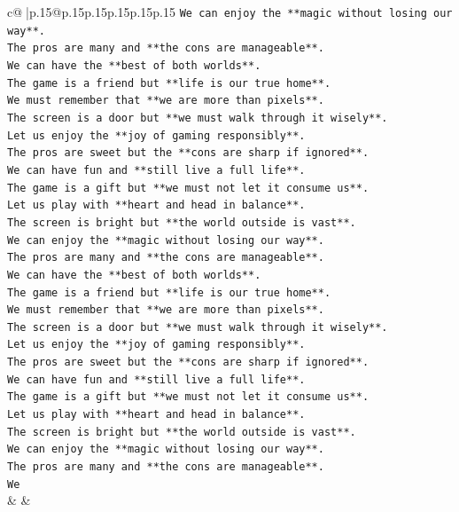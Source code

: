 \documentclass{article}
\begin{document}
{\begin{supertabular}{c@{$\;$}|p{.15\linewidth}@{}p{.15\linewidth}p{.15\linewidth}p{.15\linewidth}p{.15\linewidth}p{.15\linewidth}}
{{{\texttt{We can enjoy the **magic without losing our way**.} \\
\texttt{The pros are many and **the cons are manageable**.} \\
\texttt{We can have the **best of both worlds**.} \\
\texttt{The game is a friend but **life is our true home**.} \\
\texttt{We must remember that **we are more than pixels**.} \\
\texttt{The screen is a door but **we must walk through it wisely**.} \\
\texttt{Let us enjoy the **joy of gaming responsibly**.} \\
\texttt{The pros are sweet but the **cons are sharp if ignored**.} \\
\texttt{We can have fun and **still live a full life**.} \\
\texttt{The game is a gift but **we must not let it consume us**.} \\
\texttt{Let us play with **heart and head in balance**.} \\
\texttt{The screen is bright but **the world outside is vast**.} \\
\texttt{We can enjoy the **magic without losing our way**.} \\
\texttt{The pros are many and **the cons are manageable**.} \\
\texttt{We can have the **best of both worlds**.} \\
\texttt{The game is a friend but **life is our true home**.} \\
\texttt{We must remember that **we are more than pixels**.} \\
\texttt{The screen is a door but **we must walk through it wisely**.} \\
\texttt{Let us enjoy the **joy of gaming responsibly**.} \\
\texttt{The pros are sweet but the **cons are sharp if ignored**.} \\
\texttt{We can have fun and **still live a full life**.} \\
\texttt{The game is a gift but **we must not let it consume us**.} \\
\texttt{Let us play with **heart and head in balance**.} \\
\texttt{The screen is bright but **the world outside is vast**.} \\
\texttt{We can enjoy the **magic without losing our way**.} \\
\texttt{The pros are many and **the cons are manageable**.} \\
\texttt{We} \\
            }
        }
    }
    & & \\ \\


\end{supertabular}}
\end{document}
